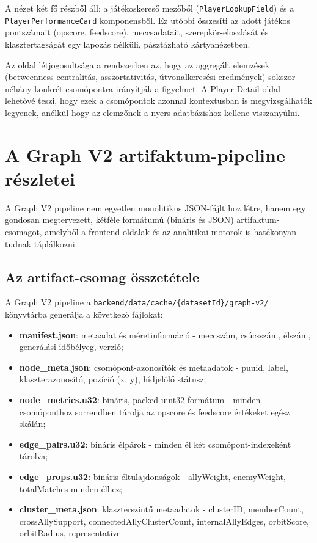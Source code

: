 ﻿\documentclass[a4paper,12pt]{report}
\begin{document}
A nézet két fő részből áll: a játékoskereső mezőből (\texttt{PlayerLookupField}) és a \texttt{PlayerPerformanceCard} komponensből. Ez utóbbi összesíti az adott játékos pontszámait (opscore, feedscore), meccsadatait, szerepkör-eloszlását és klasztertagságát egy lapozás nélküli, pásztázható kártyanézetben.

Az oldal létjogosultsága a rendszerben az, hogy az aggregált elemzések (betweenness centralitás, asszortativitás, útvonalkeresési eredmények) sokszor néhány konkrét csomópontra irányítják a figyelmet. A Player Detail oldal lehetővé teszi, hogy ezek a csomópontok azonnal kontextusban is megvizsgálhatók legyenek, anélkül hogy az elemzőnek a nyers adatbázishoz kellene visszanyúlni.

\section{A Graph V2 artifaktum-pipeline részletei}
\label{sec:graph_v2_artifact}

A Graph V2 pipeline nem egyetlen monolitikus JSON-fájlt hoz létre, hanem egy gondosan megtervezett, kétféle formátumú (bináris és JSON) artifaktum-csomagot, amelyből a frontend oldalak és az analitikai motorok is hatékonyan tudnak táplálkozni.

\subsection{Az artifact-csomag összetétele}

A Graph V2 pipeline a \texttt{backend/data/cache/\{datasetId\}/graph-v2/} könyvtárba generálja a következő fájlokat:

\begin{itemize}
    \item \textbf{manifest.json}: metaadat és méretinformáció - meccszám, csúcsszám, élszám, generálási időbélyeg, verzió;
    \item \textbf{node\_meta.json}: csomópont-azonosítók és metaadatok - puuid, label, klaszterazonosító, pozíció (x, y), hídjelölő státusz;
    \item \textbf{node\_metrics.u32}: bináris, packed uint32 formátum - minden csomóponthoz sorrendben tárolja az opscore és feedscore értékeket egész skálán;
    \item \textbf{edge\_pairs.u32}: bináris élpárok - minden él két csomópont-indexeként tárolva;
    \item \textbf{edge\_props.u32}: bináris éltulajdonságok - allyWeight, enemyWeight, totalMatches minden élhez;
    \item \textbf{cluster\_meta.json}: klaszterszintű metaadatok - clusterID, memberCount, crossAllySupport, connectedAllyClusterCount, internalAllyEdges, orbitScore, orbitRadius, representative.
\end{itemize}
\end{document}
